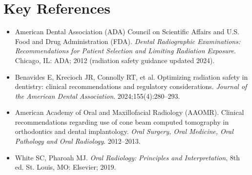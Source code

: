 \section{Key References}
\begin{itemize}
\item American Dental Association (ADA) Council on Scientific Affairs and U.S. Food and Drug Administration (FDA). \textit{Dental Radiographic Examinations: Recommendations for Patient Selection and Limiting Radiation Exposure}. Chicago, IL: ADA; 2012 (radiation safety guidance updated 2024).
\item Benavides E, Krecioch JR, Connolly RT, et al. Optimizing radiation safety in dentistry: clinical recommendations and regulatory considerations. \textit{Journal of the American Dental Association}. 2024;155(4):280--293.
\item American Academy of Oral and Maxillofacial Radiology (AAOMR). Clinical recommendations regarding use of cone beam computed tomography in orthodontics and dental implantology. \textit{Oral Surgery, Oral Medicine, Oral Pathology and Oral Radiology}. 2012--2013.
\item White SC, Pharoah MJ. \textit{Oral Radiology: Principles and Interpretation}, 8th ed. St. Louis, MO: Elsevier; 2019.
\end{itemize}
